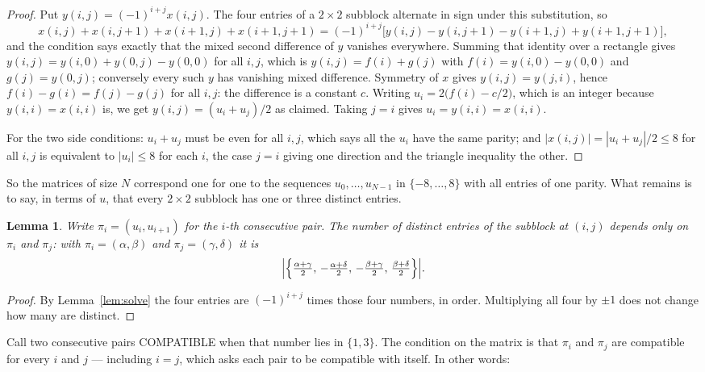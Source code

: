 \documentclass[11pt,a4paper]{article}
\theoremstyle{plain}
\newtheorem{lemma}[theorem]{Lemma}
\theoremstyle{definition}
\begin{document}
\begin{proof}
Put $y(i,j)=(-1)^{i+j}x(i,j)$. The four entries of a $2\times2$ subblock alternate in sign
under this substitution, so
\[
x(i,j)+x(i,j{+}1)+x(i{+}1,j)+x(i{+}1,j{+}1)
=(-1)^{i+j}\bigl[y(i,j)-y(i,j{+}1)-y(i{+}1,j)+y(i{+}1,j{+}1)\bigr],
\]
and the condition says exactly that the mixed second difference of $y$ vanishes everywhere.
Summing that identity over a rectangle gives
$y(i,j)=y(i,0)+y(0,j)-y(0,0)$ for all $i,j$, which is $y(i,j)=f(i)+g(j)$ with
$f(i)=y(i,0)-y(0,0)$ and $g(j)=y(0,j)$; conversely every such $y$ has vanishing mixed
difference. Symmetry of $x$ gives $y(i,j)=y(j,i)$, hence $f(i)-g(i)=f(j)-g(j)$ for all $i,j$:
the difference is a constant $c$. Writing $u_i=2\bigl(f(i)-c/2\bigr)$, which is an integer
because $y(i,i)=x(i,i)$ is, we get $y(i,j)=(u_i+u_j)/2$ as claimed. Taking $j=i$ gives
$u_i=y(i,i)=x(i,i)$.

For the two side conditions: $u_i+u_j$ must be even for all $i,j$, which says all the $u_i$ have
the same parity; and $|x(i,j)|=|u_i+u_j|/2\le8$ for all $i,j$ is equivalent to $|u_i|\le8$
for each $i$, the case $j=i$ giving one direction and the triangle inequality the other.
\end{proof}

So the matrices of size $N$ correspond one for one to the sequences $u_0,\dots,u_{N-1}$ in
$\{-8,\dots,8\}$ with all entries of one parity. What remains is to say, in terms of $u$,
that every $2\times2$ subblock has one or three distinct entries.

\begin{lemma}\label{lem:block}
Write $\pi_i=(u_i,u_{i+1})$ for the $i$-th consecutive pair. The number of distinct entries of
the subblock at $(i,j)$ depends only on $\pi_i$ and $\pi_j$: with $\pi_i=(\alpha,\beta)$ and
$\pi_j=(\gamma,\delta)$ it is
\[
\Bigl|\Bigl\{\tfrac{\alpha+\gamma}{2},\,-\tfrac{\alpha+\delta}{2},\,
-\tfrac{\beta+\gamma}{2},\,\tfrac{\beta+\delta}{2}\Bigr\}\Bigr| .
\]
\end{lemma}

\begin{proof}
By Lemma~\ref{lem:solve} the four entries are $(-1)^{i+j}$ times those four numbers, in
order. Multiplying all four by $\pm1$ does not change how many are distinct.
\end{proof}

Call two consecutive pairs COMPATIBLE when that number lies in $\{1,3\}$. The condition on the
matrix is that $\pi_i$ and $\pi_j$ are compatible for every $i$ and $j$ --- including $i=j$,
which asks each pair to be compatible with itself. In other words:
\end{document}
